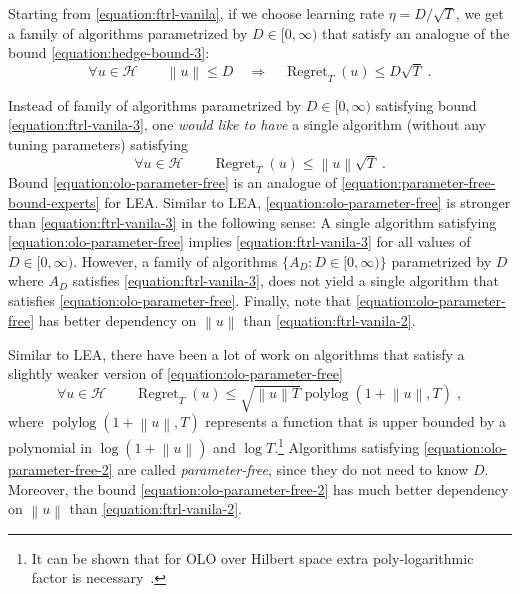 \documentclass{colt2016} %
\DeclareMathOperator{\Regret}{Regret}
\DeclareMathOperator{\polylog}{polylog}
\renewcommand{\H}{\mathcal{H}}  %
\newcommand{\norm}[1]{\left\|{#1}\right\|}
\begin{document}
Starting from \eqref{equation:ftrl-vanila}, if we choose learning rate $\eta =
D/\sqrt{T}$, we get a family of algorithms parametrized by $D \in [0,\infty)$
that satisfy an analogue of the bound \eqref{equation:hedge-bound-3}:
\begin{equation}
\label{equation:ftrl-vanila-3}
\forall u \in \H \qquad \norm{u} \le D \quad  \Longrightarrow \quad \Regret_T(u) \le D \sqrt{T} \; .
\end{equation}

Instead of family of algorithms parametrized by $D \in [0,\infty)$ satisfying
bound \eqref{equation:ftrl-vanila-3}, one \emph{would like
to have} a single algorithm (without any tuning parameters) satisfying
\begin{equation}
\label{equation:olo-parameter-free}
\forall u \in \H \qquad \Regret_T(u) \le \norm{u} \sqrt{T} \; .
\end{equation}
Bound \eqref{equation:olo-parameter-free} is an analogue of
\eqref{equation:parameter-free-bound-experts} for LEA. Similar to LEA,
\eqref{equation:olo-parameter-free} is stronger than
\eqref{equation:ftrl-vanila-3} in the following sense: A single algorithm
satisfying \eqref{equation:olo-parameter-free} implies
\eqref{equation:ftrl-vanila-3} for all values of $D \in [0,\infty)$.  However,
a family of algorithms $\{A_D : D \in [0,\infty)\}$ parametrized by $D$ where
$A_D$ satisfies \eqref{equation:ftrl-vanila-3}, does not yield a single
algorithm that satisfies \eqref{equation:olo-parameter-free}.  Finally, note
that \eqref{equation:olo-parameter-free} has better dependency on $\norm{u}$
than \eqref{equation:ftrl-vanila-2}.

Similar to LEA, there have been a lot of work on algorithms
\citep{Streeter-McMahan-2012, Orabona-2013, McMahan-Abernethy-2013,
McMahan-Orabona-2014} that satisfy a slightly weaker version of
\eqref{equation:olo-parameter-free}
\begin{equation}
\label{equation:olo-parameter-free-2}
\forall u \in \H \qquad \Regret_T(u) \le \sqrt{\norm{u} T} \polylog(1 + \norm{u}, T) \; ,
\end{equation}
where $\polylog(1 + \norm{u}, T)$ represents a function that is upper bounded
by a polynomial in $\log(1+\norm{u})$ and $\log T$.\footnote{It can be shown
that for OLO over Hilbert space extra poly-logarithmic factor is
necessary~\citep{McMahan-Abernethy-2013,Orabona-2013}.} Algorithms satisfying
\eqref{equation:olo-parameter-free-2} are called \emph{parameter-free}, since
they do not need to know $D$.  Moreover, the bound
\eqref{equation:olo-parameter-free-2} has much better dependency on $\norm{u}$
than \eqref{equation:ftrl-vanila-2}.
\end{document}

